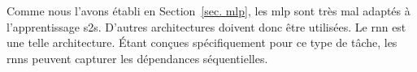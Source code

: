 \section{}
\label{sec. rnn}

Comme nous l'avons établi en Section~\ref{sec. mlp}, 
les \gls{mlp} sont très mal adaptés à l'apprentissage \gls{s2s}.
D'autres architectures doivent donc être utilisées.
Le \gls{rnn} est une telle architecture.
Étant conçues spécifiquement pour ce type de tâche, 
les \glspl{rnn} peuvent capturer les dépendances séquentielles.

